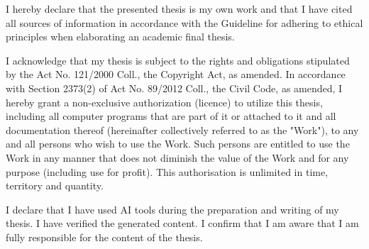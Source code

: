 \documentclass[english,bachelor,oneside]{ctufit-thesis}
\begin{document}
    \begin{declarationpage}
        I hereby declare that the presented thesis is my own work and that I have cited all sources of
        information in accordance with the Guideline for adhering to ethical principles when elaborating an
        academic final thesis.

        I acknowledge that my thesis is subject to the rights and obligations stipulated by the Act No.
        121/2000 Coll., the Copyright Act, as amended. In accordance with Section 2373(2) of Act No.
        89/2012 Coll., the Civil Code, as amended, I hereby grant a non-exclusive authorization (licence) to
        utilize this thesis, including all computer programs that are part of it or attached to it and all
        documentation thereof (hereinafter collectively referred to as the "Work"), to any and all persons
        who wish to use the Work. Such persons are entitled to use the Work in any manner that does not
        diminish the value of the Work and for any purpose (including use for profit). This authorisation is
        unlimited in time, territory and quantity.

        I declare that I have used AI tools during the preparation and writing of my thesis. I have verified
        the generated content. I confirm that I am aware that I am fully responsible for the content of the
        thesis.
    \end{declarationpage}

    \printtwopageabstract
\end{document}

